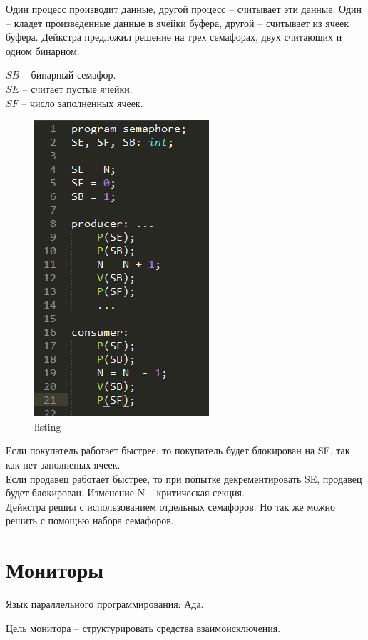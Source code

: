 Один процесс производит данные, другой процесс – считывает эти данные. Один – кладет произведенные данные в ячейки буфера, другой – считывает из ячеек буфера.  Дейкстра предложил решение на трех семафорах, двух считающих и одном бинарном. 

$SB$ – бинарный семафор.\\
$SE$ – считает пустые ячейки.\\
$SF$ – число заполненных ячеек.

\begin{figure}[H]
    \centering
    \includegraphics{listing/2.png}
    \caption{listing}
\end{figure}

Если покупатель работает быстрее, то покупатель будет блокирован на SF, так как нет заполненых ячеек.\\
Если продавец работает быстрее, то при попытке декрементировать SE, продавец будет блокирован.  Изменение N – критическая секция. \\
Дейкстра решил с использованием отдельных семафоров. Но так же можно решить с помощью набора семафоров.

\section{Мониторы}

Язык параллельного программирования: Ада. 

Цель монитора – структурировать средства взаимоисключения.

